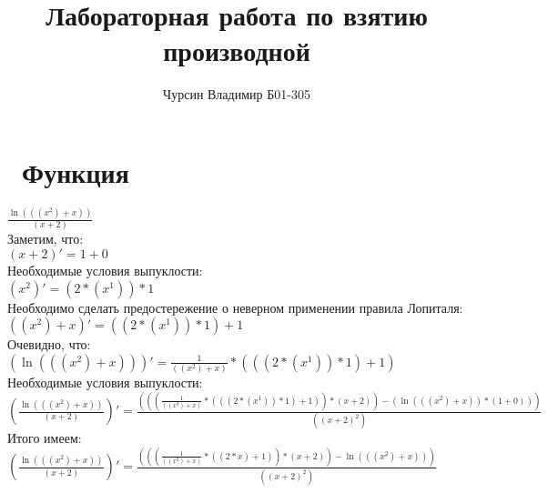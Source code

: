 \documentclass[a4paper,14pt]{extarticle}
\title{\textbf{Лабораторная работа по взятию производной }}\author{Чурсин Владимир Б01-305}
\begin{document}
\maketitle
\section{\ Функция \\}$\frac{\ln{(((x^2)+x))}}{(x+2)}$ \newline \\ 
Заметим, что: \\ 

$(x+2)' = 1+0$ \newline \\ 
Необходимые условия выпуклости: \\ 

$(x^2)' = (2*(x^1))*1$ \newline \\ 
Необходимо сделать предостережение о неверном применении правила Лопиталя: \\ 

$((x^2)+x)' = ((2*(x^1))*1)+1$ \newline \\ 
Очевидно, что: \\ 

$(\ln{(((x^2)+x))})' = \frac{1}{((x^2)+x)}*(((2*(x^1))*1)+1)$ \newline \\ 
Необходимые условия выпуклости: \\ 

$(\frac{\ln{(((x^2)+x))}}{(x+2)})' = \frac{(((\frac{1}{((x^2)+x)}*(((2*(x^1))*1)+1))*(x+2))-(\ln{(((x^2)+x))}*(1+0)))}{((x+2)^2)}$ \newline \\ 
Итого имеем: \\
$(\frac{\ln{(((x^2)+x))}}{(x+2)})' = \frac{(((\frac{1}{((x^2)+x)}*((2*x)+1))*(x+2))-\ln{(((x^2)+x))})}{((x+2)^2)}$ \newline \\ 
\end{document}
